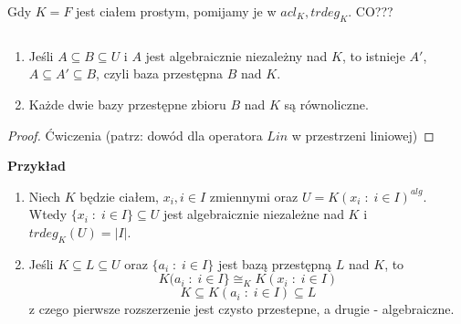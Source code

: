 Gdy $K=F$ jest ciałem prostym, pomijamy je w $acl_K,trdeg_K$. {\large\color{orange}CO???}

\begin{theorem}$ $

\begin{enumerate}
    \item Jeśli $A\subseteq B\subseteq U$ i $A$ jest algebraicznie niezależny nad $K$, to istnieje $A'$, $A\subseteq A'\subseteq B$, czyli baza przestępna $B$ nad $K$.
    \item Każde dwie bazy przestępne zbioru $B$ nad $K$ są równoliczne.
\end{enumerate}
\end{theorem}
\begin{proof}
Ćwiczenia (patrz: dowód dla operatora $Lin$ w przestrzeni liniowej)
\end{proof}

\textbf{Przykład}
\begin{enumerate}
    \item Niech $K$ będzie ciałem, $x_i, i\in I$ zmiennymi oraz $U=K(x_i\;:\;i\in I)^{alg}$. Wtedy $\{x_i\;:\;i\in I\}\subseteq U$ jest algebraicznie niezależne nad $K$ i $trdeg_K(U)=|I|$.
    \item Jeśli $K\subseteq L\subseteq U$ oraz $\{a_i\;:\;i\in I\}$ jest bazą przestępną $L$ nad $K$, to
    $$K(a_i\;:\;i\in I\}\cong_KK(x_i\;:\;i\in I)$$
    $$K\subseteq K(a_i\;:\;i\in I)\subseteq L$$
    z czego pierwsze rozszerzenie jest czysto przestepne, a drugie - algebraiczne.
\end{enumerate}
